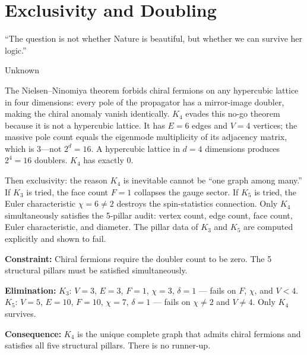 \documentclass[11pt,a4paper]{book}
\begin{document}
\chapter{Exclusivity and Doubling}
\label{ch:exclusivity-doubling}

\epigraph{``The question is not whether Nature is beautiful, but whether we can survive her logic.''}{Unknown}

The Nielsen--Ninomiya theorem forbids chiral fermions on any hypercubic lattice in four dimensions: every pole of the propagator has a mirror-image doubler, making the chiral anomaly vanish identically. $K_4$ evades this no-go theorem because it is not a hypercubic lattice. It has $E = 6$ edges and $V = 4$ vertices; the massive pole count equals the eigenmode multiplicity of its adjacency matrix, which is 3---not $2^d = 16$. A hypercubic lattice in $d = 4$ dimensions produces $2^4 = 16$ doublers. $K_4$ has exactly 0.

Then exclusivity: the reason $K_4$ is inevitable cannot be ``one graph among many.'' If $K_3$ is tried, the face count $F = 1$ collapses the gauge sector. If $K_5$ is tried, the Euler characteristic $\chi = 6 \neq 2$ destroys the spin-statistics connection. Only $K_4$ simultaneously satisfies the 5-pillar audit: vertex count, edge count, face count, Euler characteristic, and diameter. The pillar data of $K_3$ and $K_5$ are computed explicitly and shown to fail.

\textbf{Constraint:} Chiral fermions require the doubler count to be zero. The 5 structural pillars must be satisfied simultaneously.

\textbf{Elimination:} $K_3$: $V=3$, $E=3$, $F=1$, $\chi=3$, $\delta=1$ --- fails on $F$, $\chi$, and $V < 4$. $K_5$: $V=5$, $E=10$, $F=10$, $\chi=7$, $\delta=1$ --- fails on $\chi \neq 2$ and $V \neq 4$. Only $K_4$ survives.

\textbf{Consequence:} $K_4$ is the unique complete graph that admits chiral fermions and satisfies all five structural pillars. There is no runner-up.
\end{document}
